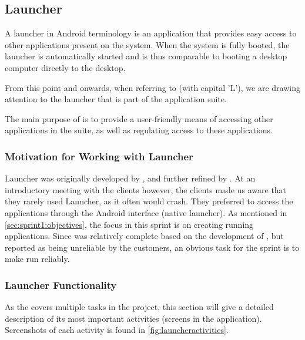 \subsection{Launcher}\label{sec:launcher}
A launcher in Android terminology is an application that provides easy access to other applications present on the system.
When the system is fully booted, the launcher is automatically started and is thus comparable to booting a desktop computer directly to the desktop.

From this point and onwards, when referring to \textit{\launcher} (with capital 'L'), we are drawing attention to the launcher that is part of the \giraf application suite.

The main purpose of \launcher is to provide a user-friendly means of accessing other applications in the \giraf suite, as well as regulating access to these applications. 

\subsubsection{Motivation for Working with Launcher}
Launcher was originally developed by \citet{launcher2011}, and further refined by \citet{launcher2012}.
At an introductory meeting with the clients however, the clients made us aware that they rarely used Launcher, as it often would crash.
They preferred to access the \giraf applications through the Android interface (native launcher).
As mentioned in \cref{sec:sprint1:objectives}, the focus in this sprint is on creating running applications.
Since \launcher was relatively complete based on the development of \citet{launcher2012}, but reported as being unreliable by the customers, an obvious task for the sprint is to make \launcher run reliably.

\subsubsection{Launcher Functionality}
As the \launcher covers multiple tasks in the \giraf project, this section will give a detailed description of its most important activities (screens in the application).
Screenshots of each activity is found in \cref{fig:launcheractivities}.

